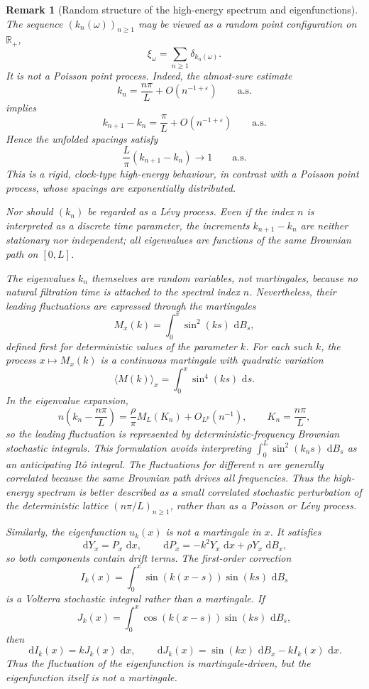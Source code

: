 \documentclass[11pt]{article}
\newtheorem{remark}[theorem]{Remark}
\newcommand{\dd}{\,\mathrm d}
\begin{document}
\begin{remark}[Random structure of the high-energy spectrum and eigenfunctions]
The sequence $(k_n(\omega))_{n\ge1}$ may be viewed as a random point
configuration on $\mathbb R_+$,
\[
    \xi_\omega=\sum_{n\ge1}\delta_{k_n(\omega)}.
\]
It is not a Poisson point process.  Indeed, the almost-sure estimate
\[
    k_n=\frac{n\pi}{L}+O(n^{-1+\varepsilon})
    \qquad\text{a.s.}
\]
implies
\[
    k_{n+1}-k_n=\frac{\pi}{L}+O(n^{-1+\varepsilon})
    \qquad\text{a.s.}
\]
Hence the unfolded spacings satisfy
\[
    \frac{L}{\pi}(k_{n+1}-k_n)\to1
    \qquad\text{a.s.}
\]
This is a rigid, clock-type high-energy behaviour, in contrast with a
Poisson point process, whose spacings are exponentially distributed.

Nor should $(k_n)$ be regarded as a L\'evy process.  Even if the index $n$
is interpreted as a discrete time parameter, the increments
$k_{n+1}-k_n$ are neither stationary nor independent; all eigenvalues are
functions of the same Brownian path on $[0,L]$.

The eigenvalues $k_n$ themselves are random variables, not martingales,
because no natural filtration time is attached to the spectral index $n$.
Nevertheless, their leading fluctuations are expressed through the martingales
\[
    M_x(k)=\int_0^x\sin^2(ks)\,\dd B_s,
\]
defined first for deterministic values of the parameter $k$.  For each such
$k$, the process $x\mapsto M_x(k)$ is a continuous martingale with quadratic
variation
\[
    \langle M(k)\rangle_x=\int_0^x\sin^4(ks)\,\dd s.
\]
In the eigenvalue expansion,
\[
    n\left(k_n-\frac{n\pi}{L}\right)
    =
    \frac{\rho}{\pi}M_L(K_n)+O_{L^p}(n^{-1}),
    \qquad K_n=\frac{n\pi}{L},
\]
so the leading fluctuation is represented by deterministic-frequency Brownian
stochastic integrals.  This formulation avoids interpreting
$\int_0^L\sin^2(k_ns)\,\dd B_s$ as an anticipating It\^o integral.  The
fluctuations for different $n$ are generally correlated because the same
Brownian path drives all frequencies.  Thus the high-energy spectrum is better
described as a small correlated stochastic perturbation of the deterministic
lattice $(n\pi/L)_{n\ge1}$, rather than as a Poisson or L\'evy process.

Similarly, the eigenfunction $u_k(x)$ is not a martingale in $x$.  It
satisfies
\[
    \dd Y_x=P_x\,\dd x,\qquad
    \dd P_x=-k^2Y_x\,\dd x+\rho Y_x\,\dd B_x,
\]
so both components contain drift terms.  The first-order correction
\[
    I_k(x)=\int_0^x\sin(k(x-s))\sin(ks)\,\dd B_s
\]
is a Volterra stochastic integral rather than a martingale.  If
\[
    J_k(x)=\int_0^x\cos(k(x-s))\sin(ks)\,\dd B_s,
\]
then
\[
    \dd I_k(x)=kJ_k(x)\,\dd x,\qquad
    \dd J_k(x)=\sin(kx)\,\dd B_x-kI_k(x)\,\dd x.
\]
Thus the fluctuation of the eigenfunction is martingale-driven, but the
eigenfunction itself is not a martingale.
\end{remark}
\end{document}
